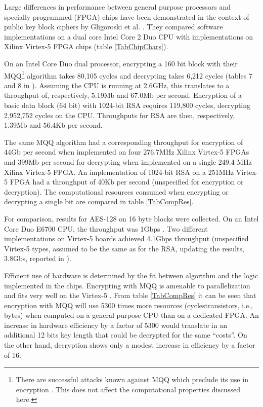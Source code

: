 \documentclass{article}
\begin{document}
Large differences in performance between general purpose processors and specially programmed 
(FPGA) chips have been demonstrated in the context of public key block ciphers by Gligoroski et al.
\cite{Gligoroski0808.0247}. 
They compared software implementations on a dual core Intel Core 2 Duo CPU
with implementations on Xilinx Virtex-5 FPGA chips  (table \ref{TabChipChars}).

On an Intel Core Duo dual processor, encrypting a 160 bit block with their MQQ\footnote{There are
successful attacks known against MQQ which preclude its use in encryption \cite{PersonalGligoroski}.
This does not affect the computational properties discussed here.} algorithm
takes 80,105 cycles and decrypting takes 6,212 cycles (tables 7 and 8 in \cite{Gligoroski0808.0247}). Assuming 
the CPU is running at 2.6GHz, this translates to a throughput of, respectively,  5.19Mb 
and 67.0Mb per second. Encryption of a basic data block (64 bit) with 1024-bit RSA requires
119,800 cycles, decrypting 2,952,752 cycles on the CPU. Throughputs for RSA are then,
respectively, 1.39Mb and 56.4Kb per second.

\begin{comment}
MQQ enc: 160*2.6*10^9/80105
MQQ dec: 160* 2.6*10^9/6212
RSA enc: 64 * 2.6*10^9/119800
RSA dec: 64 * 2.6*10^9/2952752
\end{comment}


The same MQQ algorithm had a corresponding throughput for encryption of 44Gb per second
when implemented on four 276.7MHz Xilinx Virtex-5 FPGAs and 399Mb 
per second for decrypting when implemented on a single 249.4 MHz Xilinx Virtex-5
FPGA. An implementation of 1024-bit RSA on a 251MHz Virtex-5 FPGA had a throughput 
of 40Kb per second (unspecified for encryption or decryption). The computational
resources consumed when encrypting or decrypting a single bit are compared in table 
\ref{TabCompRes}.

For comparison, results for AES-128 on 16 byte blocks were collected. On an Intel Core Duo
E6700 CPU, the throughput was 1Gbps \cite{JemMatzan2006}. Two different implementations 
on Virtex-5 boards 
achieved 4.1Gbps throughput \cite{bulens2008implementation} (unspecified Virtex-5 types, assumed
to be the same as for the RSA, updating the results, 3.8Gbs, reported in \cite{Gligoroski0808.0247}). 

Efficient use of hardware is determined by the fit between algorithm and the logic implemented in the
chips. Encrypting with MQQ is amenable to parallelization and fits very well on the Virtex-5 
\cite{PersonalGligoroski}. From table \ref{TabCompRes} it can be seen that encryption with MQQ will use
5300 times more resources (cyclestransistors, i.e., bytes) when computed on a general 
purpose CPU than on a dedicated FPGA. 
An increase in hardware efficiency by a factor of 5300 would translate in an additional 12 bits
key length that could be decrypted for the same ``costs''. On the other hand, decryption shows
only a modest increase in efficiency by a factor of 16.
\end{document}
